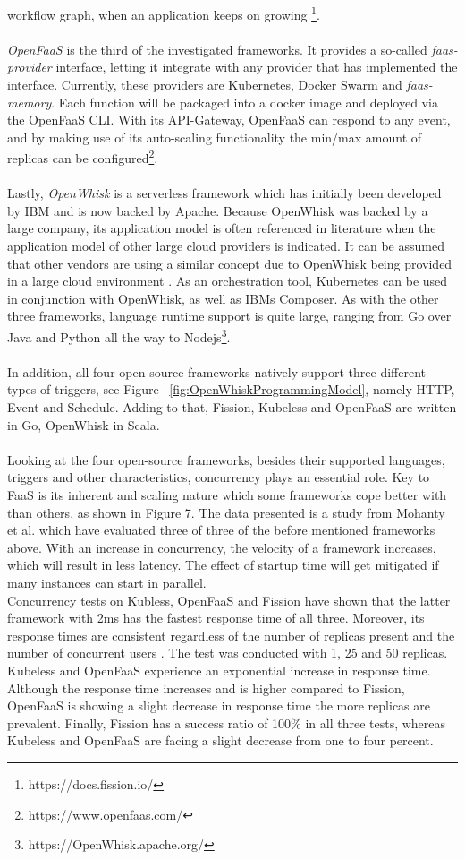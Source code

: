 \documentclass[a4paper,11pt, pagesize]{scrartcl}
\begin{document}
\begin{spacing}{1.2}
workflow graph, when an application keeps on growing \footnote{https://docs.fission.io/}.\\\\ \textit{OpenFaaS} is the third of the investigated frameworks. It provides a so-called \textit{faas-provider} interface, letting it integrate with any provider that has implemented the interface. Currently, these providers are Kubernetes, Docker Swarm and \textit{faas-memory}. Each function will be packaged into a docker image and deployed via the OpenFaaS CLI. With its API-Gateway, OpenFaaS can respond to any event, and by making use of its auto-scaling functionality the min/max amount of replicas can be configured\footnote{https://www.openfaas.com/}.\\\\ Lastly, \textit{OpenWhisk} is a serverless framework which has initially been developed by IBM and is now backed by Apache. Because OpenWhisk was backed by a large company, its application model is often referenced in literature when the application model of other large cloud providers is indicated. It can be assumed that other vendors are using a similar concept due to OpenWhisk being provided in a large cloud environment \cite{van2019spec}. As an orchestration tool, Kubernetes can be used in conjunction with OpenWhisk, as well as IBMs Composer. As with the other three frameworks, language runtime support is quite large, ranging from Go over Java and Python all the way to Nodejs\footnote{https://OpenWhisk.apache.org/}.\\\\ In addition,  all four open-source frameworks natively support three different types of triggers, see Figure ~\ref{fig:OpenWhiskProgrammingModel}, namely HTTP, Event and Schedule. Adding to that, Fission, Kubeless and OpenFaaS are written in Go, OpenWhisk in Scala.\\\\Looking at the four open-source frameworks, besides their supported languages, triggers and other characteristics, concurrency plays an essential role. Key to FaaS is its inherent and scaling nature which some frameworks cope better with than others, as shown in Figure 7. The data presented is a study from Mohanty et al. which have evaluated three of three of the before mentioned frameworks above. With an increase in concurrency, the velocity of a framework increases, which will result in less latency. The effect of startup time will get mitigated if many instances can start in parallel.\\Concurrency tests on Kubless, OpenFaaS and Fission have shown that the latter framework with 2ms has the fastest response time of all three. Moreover, its response times are consistent regardless of the number of replicas present and the number of concurrent users \cite{mohanty2018evaluation}. The test was conducted with 1, 25 and 50 replicas. Kubeless and OpenFaaS experience an exponential increase in response time. Although the response time increases and is higher compared to Fission, OpenFaaS is showing a slight decrease in response time the more replicas are prevalent. Finally, Fission has a success ratio of 100\% in all three tests, whereas Kubeless and OpenFaaS are facing a slight decrease from one to four percent.

\end{spacing}
\end{document}
